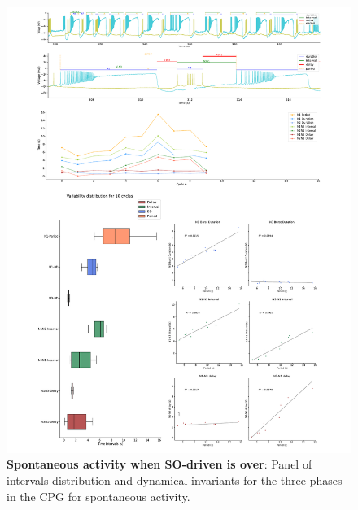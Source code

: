 \begin{figure}[htbp]
	\centering
	\includegraphics[width=1.1\textwidth]{./invariants/data/SUSSEX/prep4_so_no_driven/images/panel_with_intervals.pdf}
	\caption{\textbf{Spontaneous activity when SO-driven is over}: Panel of intervals distribution and dynamical invariants for the three phases in the CPG for spontaneous activity.}
	\label{fig:no so spontaneous invariants}
\end{figure}
 	 
